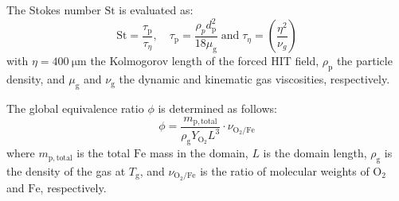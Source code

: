 \documentclass[times,twocolumn,final]{elsarticle}
\newcommand{\mrm}[1]{\mathrm{#1}}
\newcommand{\St}{\mathrm{St}}
\newcommand{\green}{\color{ForestGreen}}
\newcommand{\green}{}
\begin{document}
{\green 
The Stokes number $\St$ is evaluated as:
\begin{equation}
    \St = \frac{\tau_\mrm{p}}{\tau_\eta},\quad \tau_\mrm{p}=\frac{\rho_pd_\mrm{p}^2}{18\mu_\mrm{g}}\; \mathrm{and}\; \tau_\eta = \left( \frac{\eta^2}{\nu_g}\right)
\end{equation}
\noindent with $\eta=\SI{400}{\micro\meter}$ the Kolmogorov length of the forced HIT field, $\rho_\mrm{p}$ the particle density, and $\mu_\mrm{g}$ and $\nu_\mrm{g}$ the dynamic and kinematic gas viscosities, respectively.}

The global equivalence ratio $\phi$ is determined as follows:
\begin{equation}
    \phi = \frac{m_\mathrm{p,total}}{\rho_\mrm{g} Y_\mrm{O_2} L^3} \cdot \nu_\mrm{O_2/Fe} \label{eq:phi1}
\end{equation}
\noindent where $m_\mrm{p,total}$ is the total $\mrm{Fe}$ mass in the domain, $L$ is the domain length, $\rho_\mrm{g}$ is the density of the gas at $T_\mrm{g}$, and $\nu_\mrm{O_2/Fe}$ is the ratio of molecular weights of $\mrm{O_2}$ and $\mrm{Fe}$, respectively.
\end{document}
